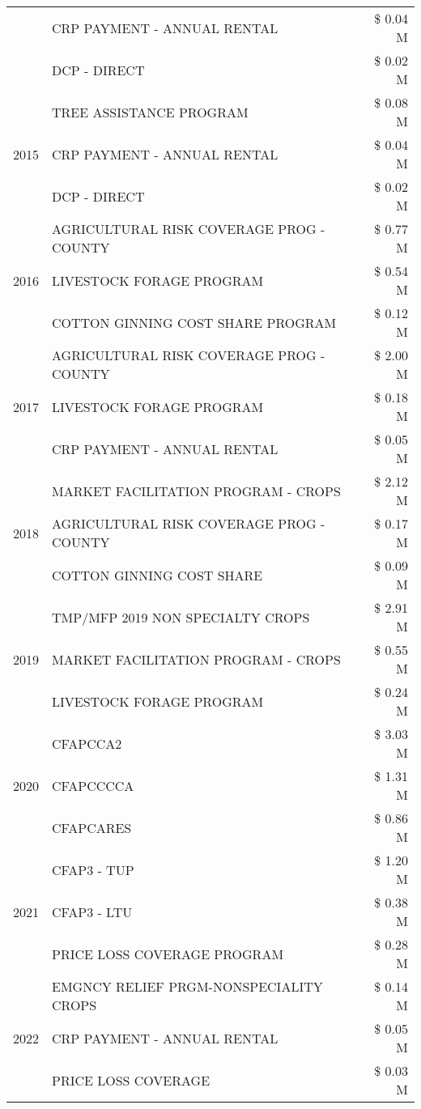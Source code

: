 \begin{tabular}{llr}
 & CRP PAYMENT - ANNUAL RENTAL & \$ 0.04 M \\
 & DCP - DIRECT & \$ 0.02 M \\
\cline{1-3}
\multirow[t]{3}{*}{2015} & TREE ASSISTANCE PROGRAM & \$ 0.08 M \\
 & CRP PAYMENT - ANNUAL RENTAL & \$ 0.04 M \\
 & DCP - DIRECT & \$ 0.02 M \\
\cline{1-3}
\multirow[t]{3}{*}{2016} & AGRICULTURAL RISK COVERAGE PROG - COUNTY & \$ 0.77 M \\
 & LIVESTOCK FORAGE PROGRAM & \$ 0.54 M \\
 & COTTON GINNING COST SHARE PROGRAM & \$ 0.12 M \\
\cline{1-3}
\multirow[t]{3}{*}{2017} & AGRICULTURAL RISK COVERAGE PROG - COUNTY & \$ 2.00 M \\
 & LIVESTOCK FORAGE PROGRAM & \$ 0.18 M \\
 & CRP PAYMENT - ANNUAL RENTAL & \$ 0.05 M \\
\cline{1-3}
\multirow[t]{3}{*}{2018} & MARKET FACILITATION PROGRAM - CROPS & \$ 2.12 M \\
 & AGRICULTURAL RISK COVERAGE PROG - COUNTY & \$ 0.17 M \\
 & COTTON GINNING COST SHARE & \$ 0.09 M \\
\cline{1-3}
\multirow[t]{3}{*}{2019} & TMP/MFP 2019 NON SPECIALTY CROPS & \$ 2.91 M \\
 & MARKET FACILITATION PROGRAM - CROPS & \$ 0.55 M \\
 & LIVESTOCK FORAGE PROGRAM & \$ 0.24 M \\
\cline{1-3}
\multirow[t]{3}{*}{2020} & CFAPCCA2 & \$ 3.03 M \\
 & CFAPCCCCA & \$ 1.31 M \\
 & CFAPCARES & \$ 0.86 M \\
\cline{1-3}
\multirow[t]{3}{*}{2021} & CFAP3 - TUP & \$ 1.20 M \\
 & CFAP3 - LTU & \$ 0.38 M \\
 & PRICE LOSS COVERAGE PROGRAM & \$ 0.28 M \\
\cline{1-3}
\multirow[t]{3}{*}{2022} & EMGNCY RELIEF PRGM-NONSPECIALITY CROPS & \$ 0.14 M \\
 & CRP PAYMENT - ANNUAL RENTAL & \$ 0.05 M \\
 & PRICE LOSS COVERAGE & \$ 0.03 M \\
\cline{1-3}
\bottomrule
\end{tabular}
